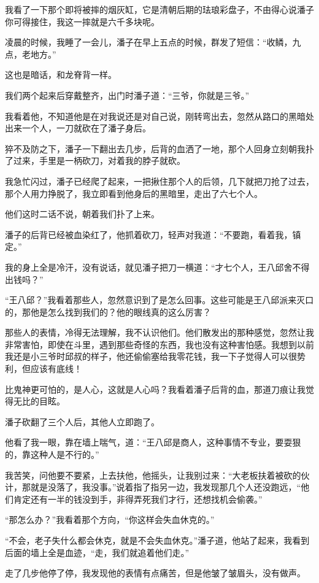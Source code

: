 我看了一下那个即将被摔的烟灰缸，它是清朝后期的珐琅彩盘子，不由得心说潘子你可得接住，我这一摔就是六千多块呢。

凌晨的时候，我睡了一会儿，潘子在早上五点的时候，群发了短信：“收鳞，九点，老地方。”

这也是暗话，和龙脊背一样。

我们两个起来后穿戴整齐，出门时潘子道：“三爷，你就是三爷。”

我看着他，不知道他是在对我说还是对自己说，刚转弯出去，忽然从路口的黑暗处出来一个人，一刀就砍在了潘子身后。

猝不及防之下，潘子一下翻出去几步，后背的血洒了一地，那个人回身立刻朝我扑了过来，手里是一柄砍刀，对着我的脖子就砍。

我急忙闪过，潘子已经爬了起来，一把揪住那个人的后领，几下就把刀抢了过去，那个人用力挣脱了，我立即看到他身后的黑暗里，走出了六七个人。

他们这时二话不说，朝着我们扑了上来。

潘子的后背已经被血染红了，他抓着砍刀，轻声对我道：“不要跑，看着我，镇定。”

我的身上全是冷汗，没有说话，就见潘子把刀一横道：“才七个人，王八邱舍不得出钱吗？”

“王八邱？”我看着那些人，忽然意识到了是怎么回事。这些可能是王八邱派来灭口的，那他是怎么找到我们的？他的眼线真的这么厉害？

那些人的表情，冷得无法理解，我不认识他们。他们散发出的那种感觉，忽然让我非常害怕，即使在斗里，遇到那些奇怪的东西，我也没有这种害怕感。我想到以前我还是小三爷时邱叔的样子，他还偷偷塞给我零花钱，我一下子觉得人可以很势利，但应该有底线！

比鬼神更可怕的，是人心，这就是人心吗？我看着潘子后背的血，那道刀痕让我觉得无比的目眩。

潘子砍翻了三个人后，其他人立即跑了。

他看了我一眼，靠在墙上喘气，道：“王八邱是商人，这种事情不专业，要耍狠的，靠这种人是不行的。”

我苦笑，问他要不要紧，上去扶他，他摇头，让我别过来：“大老板扶着被砍的伙计，那就是没落了，我没事。”说着指了指另一边，我发现那几个人还没跑远，“他们肯定还有一半的钱没到手，非得弄死我们才行，还想找机会偷袭。”

“那怎么办？”我看着那个方向，“你这样会失血休克的。”

“不会，老子失什么都会休克，就是不会失血休克。”潘子道，他站了起来，我看到后面的墙上全是血迹，“走，我们就追着他们走。”

走了几步他停了停，我发现他的表情有点痛苦，但是他皱了皱眉头，没有做声。

